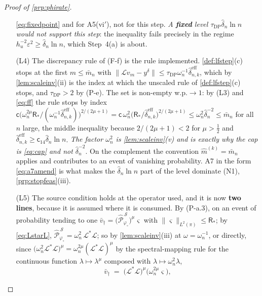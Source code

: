 \begin{proof}[Proof of \cref{prp:phirate}]
\begin{enumerate}
\eqref{eq:fixedpoint} and for A5(vi$'$), not for this step.
\emph{A \textbf{fixed} level $\tau_{\mathrm{DP}}\hat\delta_n\ln n$ would not support this step}: the
inequality fails precisely in the regime
$h_u^{-2}\varepsilon^{2}\ge\hat\delta_n\ln n$, which Step~4(a) is about.
\item[(L4)] The discrepancy rule of \textup{(F-f)} is the rule implemented.
\cref{def:lfstep}(c) stops at the first $m\le\bar m_n$ with
$\|\mathcal Lv_m-y^\delta\|\le\tau_{\mathrm{DP}}\omega_n^{-1}\hat\delta^{\mathrm{eff}}_{n,k}$,
which by \cref{lem:scaleinv}(ii) is the index at which the unscaled rule of \cref{def:lfstep}(c) stops,
and $\tau_{\mathrm{DP}}>2$ by (P-e). The set is non-empty w.p.$\to1$: by (L3) and \eqref{eq:ff} the rule
stops by index
$\mathsf c\big(\omega_n^{2\mu}\mathsf R_\ast\big/(\omega_n^{-1}\hat\delta^{\mathrm{eff}}_{n,k})\big)^{2/(2\mu+1)}
=\mathsf c\,\omega_n^{2}\big(\mathsf R_\ast/\hat\delta^{\mathrm{eff}}_{n,k}\big)^{2/(2\mu+1)}
\le\omega_n^{2}\hat\delta_n^{-2}\le\bar m_n$
for all $n$ large, the middle inequality because $2/(2\mu+1)<2$ for $\mu>\tfrac12$ and
$\hat\delta^{\mathrm{eff}}_{n,k}\ge\mathsf c_{14}\hat\delta_n\ln n$. \emph{The factor $\omega_n^{2}$
is \cref{lem:scaleinv}(v) and is exactly why the cap is \eqref{eq:cap} and not $\hat\delta_n^{-2}$}.
On the complement the convention $\hat m^{(k)}=\bar m_n$ applies and contributes to an event of
vanishing probability. A7 in the form \eqref{eq:a7amend} is what makes the $\hat\delta_n\ln n$ part of
the level dominate (N1), \cref{prp:stopfeas}(iii).
\item[(L5)] The source condition holds at the operator used, and it is now \textbf{two lines},
because it is assumed where it is consumed. By (P-a.3), on an event of probability tending to one
$\bar v_\dagger=\big(\hat{\mathcal P}^{\,\mathcal S}_{\varphi_\circ}\big)^{\mu}\varsigma$ with
$\|\varsigma\|_{L^{2}(\pi)}\le\mathsf R_\ast$; by \eqref{eq:LstarL},
$\hat{\mathcal P}^{\,\mathcal S}_{\varphi_\circ}=\omega_n^{2}\,\mathcal L^{\ast}\mathcal L$; so by
\cref{lem:scaleinv}(iii) at $\omega=\omega_n^{-1}$, or directly, since
$\big(\omega_n^{2}\mathcal L^{\ast}\mathcal L\big)^{\mu}=\omega_n^{2\mu}(\mathcal L^{\ast}\mathcal L)^{\mu}$
by the spectral-mapping rule for the continuous function $\lambda\mapsto\lambda^{\mu}$ composed with
$\lambda\mapsto\omega_n^{2}\lambda$, 
\[
\bar v_\dagger\;=\;\big(\mathcal L^{\ast}\mathcal L\big)^{\mu}\big(\omega_n^{2\mu}\varsigma\big),
\]
\end{enumerate}
\end{proof}
